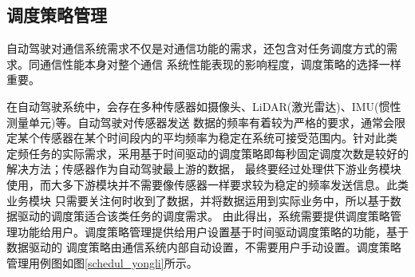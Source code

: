 
\subsection{调度策略管理}
自动驾驶对通信系统需求不仅是对通信功能的需求，还包含对任务调度方式的需求。同通信性能本身对整个通信
系统性能表现的影响程度，调度策略的选择一样重要。

在自动驾驶系统中，会存在多种传感器如摄像头、LiDAR(激光雷达)、IMU(惯性测量单元)等。自动驾驶对传感器发送
数据的频率有着较为严格的要求，通常会限定某个传感器在某个时间段内的平均频率为稳定在系统可接受范围内。针对此类
定频任务的实际需求，采用基于时间驱动的调度策略即每秒固定调度次数是较好的解决方法；传感器作为自动驾驶最上游的数据，
最终要经过处理供下游业务模块使用，而大多下游模块并不需要像传感器一样要求较为稳定的频率发送信息。此类业务模块
只需要关注何时收到了数据，并将数据运用到实际业务中，所以基于数据驱动的调度策适合该类任务的调度需求。
由此得出，系统需要提供调度策略管理功能给用户。调度策略管理提供给用户设置基于时间驱动调度策略的功能，基于数据驱动的
调度策略由通信系统内部自动设置，不需要用户手动设置。调度策略管理用例图如图\ref{schedul_yongli}所示。


